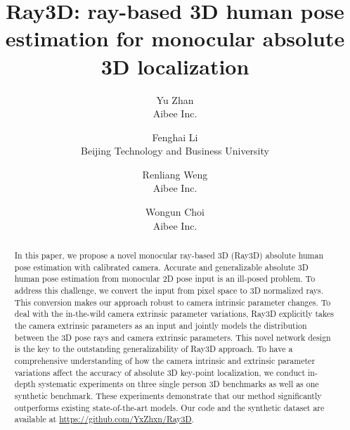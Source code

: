 \documentclass[10pt,twocolumn,letterpaper]{article}
\begin{document}
\title{Ray3D: ray-based 3D human pose estimation for monocular absolute 3D localization}

\author{Yu Zhan\\
Aibee Inc.\\

\and
Fenghai Li\\
Beijing Technology and Business University\\

\and
Renliang Weng\\
Aibee Inc.\\

\and
Wongun Choi\\
Aibee Inc.\\

}
\maketitle


\begin{abstract}
In this paper, we propose a novel monocular ray-based 3D (Ray3D) absolute human pose estimation with calibrated camera. Accurate and generalizable absolute 3D human pose estimation from monocular 2D pose input is an ill-posed problem. To address this challenge, we convert the input from pixel space to 3D normalized rays. This conversion makes our approach robust to camera intrinsic parameter changes. To deal with the in-the-wild camera extrinsic parameter variations, Ray3D explicitly takes the camera extrinsic parameters as an input and jointly models the distribution between the 3D pose rays and camera extrinsic parameters. This novel network design is the key to the outstanding generalizability of Ray3D approach. To have a comprehensive understanding of how the camera intrinsic and extrinsic parameter variations affect the accuracy of absolute 3D key-point localization, we conduct in-depth systematic experiments on three single person 3D benchmarks as well as one synthetic benchmark. These experiments demonstrate that our method significantly outperforms existing state-of-the-art models. Our code and the synthetic dataset are available at \href{https://github.com/YxZhxn/Ray3D}{https://github.com/YxZhxn/Ray3D}.
\end{abstract}
\end{document}

